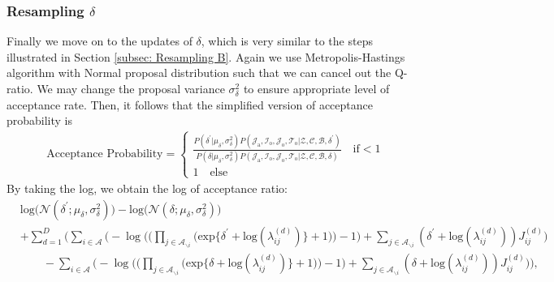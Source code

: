 \documentclass[a4paper]{article}
\begin{document}
   \subsubsection{Resampling $\delta$ }  \label{subsec: Resampling delta}
   Finally we move on to the updates of $\delta$, which is very similar to the steps illustrated in Section \ref{subsec: Resampling B}. Again we use Metropolis-Hastings algorithm with Normal proposal distribution such that we can cancel out the Q-ratio. We may change the proposal variance $\sigma^2_\delta$ to ensure appropriate level of acceptance rate. Then, it follows that the simplified version of acceptance probability is 
   \begin{equation} 
   \begin{split}
   & \mbox{Acceptance Probability}=
   \begin{cases}  \frac{P(\delta^\prime|\mu_\delta, \sigma^2_\delta) P(\mathcal{J}_{\mbox{a}}, \mathcal{I}_{\mbox{o}}, \mathcal{J}_{\mbox{o}}, \mathcal{T}_{\mbox{o}} |\mathcal{Z}, \mathcal{C}, \mathcal{B}, \delta^\prime)}{P(\delta|\mu_\delta, \sigma^2_\delta) P(\mathcal{J}_{\mbox{a}}, \mathcal{I}_{\mbox{o}}, \mathcal{J}_{\mbox{o}}, \mathcal{T}_{\mbox{o}} |\mathcal{Z}, \mathcal{C}, \mathcal{B}, \delta)}\quad\text{if}  <1\\
   1 \quad \text{else}
   \end{cases}
   \end{split}
   \end{equation}
   By taking the log, we obtain the log of acceptance ratio:
   \begin{equation}
   \begin{aligned} 
   &\mbox{log}\Big(\mathcal{N}(\delta^\prime;\mu_\delta, \sigma^2_\delta)\Big)-\mbox{log}\Big(\mathcal{N}(\delta; \mu_\delta, \sigma^2_\delta)\Big)\\&+ \sum_{d=1}^D\Bigg(\sum_{i\in \mathcal{A}}\Big(-\log\Big(\Big(\prod_{j \in \mathcal{A}_{\backslash i}} \Big(\mbox{exp}\{\delta^\prime+\mbox{log}(\lambda_{ij}^{(d)})\} + 1\Big)\Big)-1\Big) + \sum_{j \in \mathcal{A}_{\backslash i}} (\delta^\prime+\mbox{log}(\lambda_{ij}^{(d)}))J_{ij}^{(d)}\Big)
   \\&\quad\quad -\sum_{i\in \mathcal{A}}\Big(-\log\Big(\Big(\prod_{j \in \mathcal{A}_{\backslash i}} \Big(\mbox{exp}\{\delta+\mbox{log}(\lambda_{ij}^{(d)})\} + 1\Big)\Big)-1\Big) + \sum_{j \in \mathcal{A}_{\backslash i}} (\delta+\mbox{log}(\lambda_{ij}^{(d)}))J_{ij}^{(d)}\Big)\Bigg),
   \end{aligned}
   \end{equation}
\end{document}
